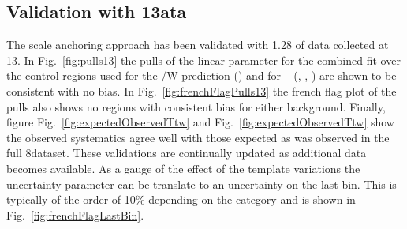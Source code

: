 \subsection{Validation with 13\texorpdfstring{\TeV} data}
\label{sec:dataValid13TeV}
The scale anchoring approach has been validated with 1.28\ifb 
of data collected at 13\TeV. In Fig.~\ref{fig:pulls13} the 
pulls of the linear parameter for the combined fit over
the control regions used for the \ttbar/W prediction (\mj)
and for \zInv~ (\mj, \mmj, \gj) are shown to be consistent with no bias.
In Fig.~\ref{fig:frenchFlagPulls13} the french flag plot of the pulls
also shows no regions with consistent bias for either background.
Finally, figure Fig.~\ref{fig:expectedObservedTtw} and Fig.~\ref{fig:expectedObservedTtw}
show the observed systematics agree well with those expected as 
was observed in the full 8\TeV dataset. These validations are
 continually updated as additional data becomes available.
As a gauge of the effect of the template variations the uncertainty parameter 
can be translate to an uncertainty on the last bin. This is typically
of the order of 10\% depending on the category and is shown
in Fig.~\ref{fig:frenchFlagLastBin}.

